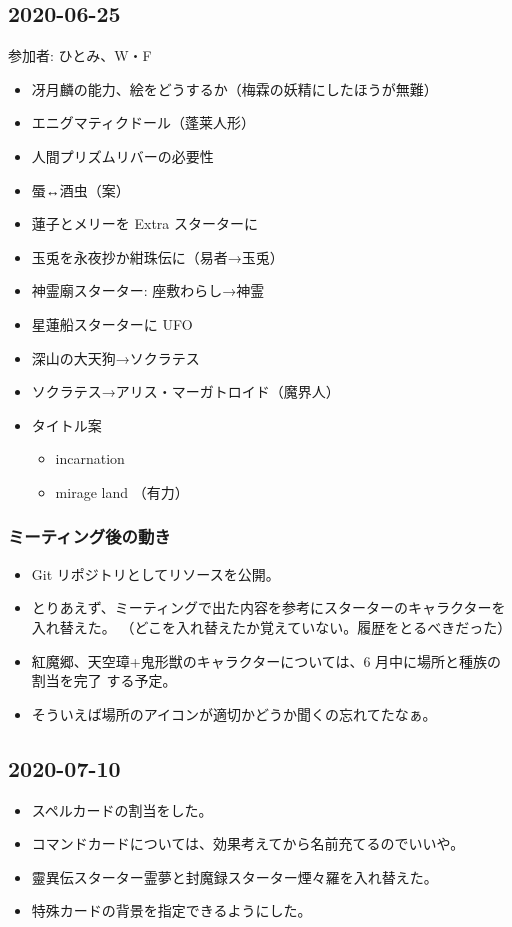 \documentclass[line_length=22zw,number_of_lines=45,twocolumn]{jlreq}
\begin{document}
\subsection{2020-06-25}
参加者: ひとみ、W・F
\begin{itemize}
	\item 冴月麟の能力、絵をどうするか（梅霖の妖精にしたほうが無難）
	\item エニグマティクドール（蓬莱人形）
	\item 人間プリズムリバーの必要性
	\item 蜃↔酒虫（案）
	\item 蓮子とメリーを Extra スターターに
	\item 玉兎を永夜抄か紺珠伝に（易者→玉兎）
	\item 神霊廟スターター: 座敷わらし→神霊
	\item 星蓮船スターターに UFO
	\item 深山の大天狗→ソクラテス
	\item ソクラテス→アリス・マーガトロイド（魔界人）
	\item タイトル案
		\begin{itemize}
			\item incarnation
			\item mirage land （有力）
		\end{itemize}
\end{itemize}

\subsubsection*{ミーティング後の動き}
\begin{itemize}
	\item Git リポジトリとしてリソースを公開。
	\item とりあえず、ミーティングで出た内容を参考にスターターのキャラクターを入れ替えた。
		（どこを入れ替えたか覚えていない。履歴をとるべきだった）
	\item 紅魔郷、天空璋+鬼形獣のキャラクターについては、6 月中に場所と種族の割当を完了
		する予定。
	\item そういえば場所のアイコンが適切かどうか聞くの忘れてたなぁ。
\end{itemize}

\subsection{2020-07-10}
\begin{itemize}
	\item スペルカードの割当をした。
	\item コマンドカードについては、効果考えてから名前充てるのでいいや。
	\item 靈異伝スターター霊夢と封魔録スターター煙々羅を入れ替えた。
	\item 特殊カードの背景を指定できるようにした。
\end{itemize}
\end{document}
